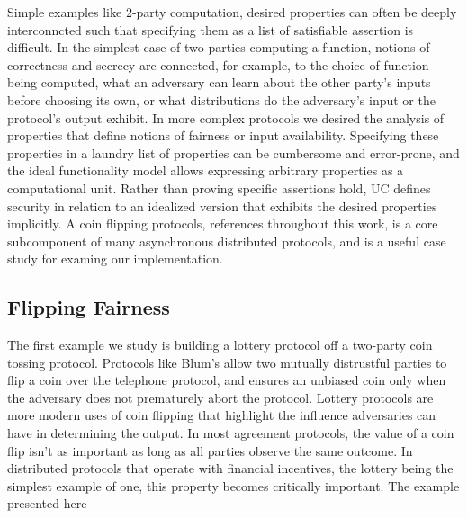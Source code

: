 Simple examples like 2-party computation, desired properties can often be deeply interconncted such that specifying them as a list of satisfiable assertion is difficult. 
In the simplest case of two parties computing a function, notions of correctness and secrecy are connected, for example, to the choice of function being computed, what an adversary can learn about the other party's inputs before choosing its own, or what distributions do the adversary's input or the protocol's output exhibit. 
In more complex protocols we desired the analysis of properties that define notions of fairness or input availability.
Specifying these properties in a laundry list of properties can be cumbersome and error-prone, and the ideal functionality model allows expressing arbitrary properties as a computational unit.
Rather than proving specific assertions hold, UC defines security in relation to an idealized version that exhibits the desired properties implicitly.
A coin flipping protocols, references throughout this work, is a core subcomponent of many asynchronous distributed protocols, and is a useful case study for examing our implementation.

\subsection{Flipping Fairness}
The first example we study is building a lottery protocol off a two-party coin tossing protocol.
Protocols like Blum's allow two mutually distrustful parties to flip a coin over the telephone protocol, and ensures an unbiased coin only when the adversary does not prematurely abort the protocol.
Lottery protocols are more modern uses of coin flipping that highlight the influence adversaries can have in determining the output.
In most agreement protocols, the value of a coin flip isn't as important as long as all parties observe the same outcome.
In distributed protocols that operate with financial incentives, the lottery being the simplest example of one, this property becomes critically important. 
The example presented here 

